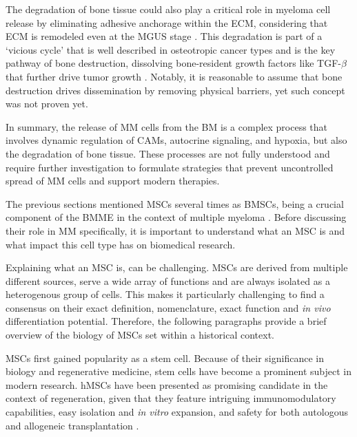 The degradation of bone tissue could also play a critical role in myeloma cell
release by eliminating adhesive anchorage within the ECM, considering that
\ac{ECM} is remodeled even at the \ac{MGUS} stage
\citet{glaveyProteomicCharacterizationHuman2017}. This degradation is part of a
‘vicious cycle' that is well described in osteotropic cancer types and is the
key pathway of bone destruction, dissolving bone-resident growth factors like
TGF-$\beta$ that further drive tumor growth
\cite{haradaMyelomaBoneInteraction2021, siclariMolecularInteractionsBreast2007,
    wangProstateCancerPromotes2019}. Notably, it is reasonable to assume that bone
destruction drives dissemination by removing physical barriers, yet such concept
was not proven yet.


In summary, the release of \ac{MM} cells from the \ac{BM} is a complex process
that involves dynamic regulation of \acp{CAM}, autocrine signaling, and hypoxia,
but also the degradation of bone tissue. These processes are not fully
understood and require further investigation to formulate strategies that
prevent uncontrolled spread of \ac{MM} cells and support modern therapies.







%
\label{sec:intro_hMSCs}%
The previous sections mentioned \acp{MSC} several times as \acp{BMSC}, being a
crucial component of the \ac{BMME} in the context of multiple myeloma
\cite{mangoliniBoneMarrowStromal2020}. Before discussing their role in \ac{MM}
specifically, it is important to understand what an \ac{MSC} is and what impact
this cell type has on biomedical research.

Explaining what an \ac{MSC} is, can be challenging. MSCs
are derived from multiple different sources, serve a wide array of functions and
are always isolated as a heterogenous group of cells. This makes it particularly
challenging to find a consensus on their exact definition, nomenclature, exact
function and \textit{in vivo} differentiation potential. Therefore, the
following paragraphs provide a brief overview of the biology of MSCs set within
a historical context.




\acp{MSC} first gained popularity as a stem cell. Because of their significance
in biology and regenerative medicine, stem cells have become a prominent subject
in modern research. \acp{hMSC} have been presented as promising candidate in the
context of regeneration, given that they feature intriguing immunomodulatory
capabilities, easy isolation and \textit{in vitro} expansion, and safety for
both autologous and allogeneic transplantation
\cite{ullahHumanMesenchymalStem2015}.



